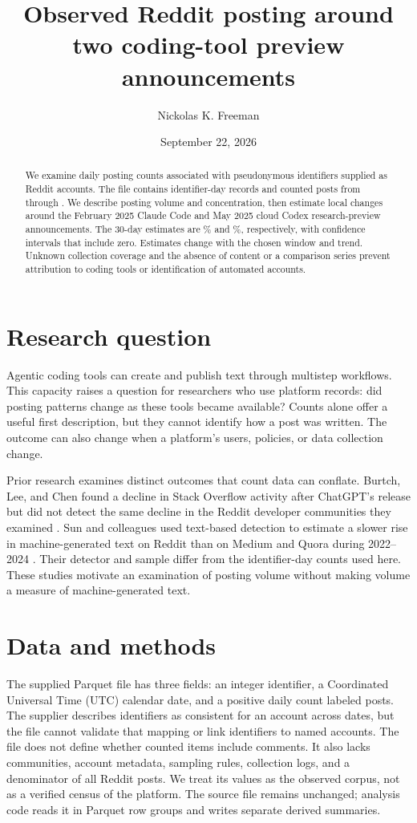 \documentclass[11pt]{article}
\title{Observed Reddit posting around two coding-tool preview announcements}
\author{Nickolas K. Freeman}
\date{September 22, 2026}
\begin{document}
\maketitle

\begin{abstract}
We examine daily posting counts associated with pseudonymous identifiers supplied as Reddit accounts. The file contains \dataUserDays{} identifier-day records and \dataPosts{} counted posts from \dataFirstDate{} through \dataLastRawDate{}. We describe posting volume and concentration, then estimate local changes around the February 2025 Claude Code and May 2025 cloud Codex research-preview announcements. The 30-day estimates are \claudeChange\% and \codexChange\%, respectively, with confidence intervals that include zero. Estimates change with the chosen window and trend. Unknown collection coverage and the absence of content or a comparison series prevent attribution to coding tools or identification of automated accounts.
\end{abstract}

\section{Research question}
Agentic coding tools can create and publish text through multistep workflows. This capacity raises a question for researchers who use platform records: did posting patterns change as these tools became available? Counts alone offer a useful first description, but they cannot identify how a post was written. The outcome can also change when a platform's users, policies, or data collection change.

Prior research examines distinct outcomes that count data can conflate. Burtch, Lee, and Chen found a decline in Stack Overflow activity after ChatGPT's release but did not detect the same decline in the Reddit developer communities they examined \cite{burtch2024}. Sun and colleagues used text-based detection to estimate a slower rise in machine-generated text on Reddit than on Medium and Quora during 2022--2024 \cite{sun2025}. Their detector and sample differ from the identifier-day counts used here. These studies motivate an examination of posting volume without making volume a measure of machine-generated text.

\section{Data and methods}
The supplied Parquet file has three fields: an integer identifier, a Coordinated Universal Time (UTC) calendar date, and a positive daily count labeled posts. The supplier describes identifiers as consistent for an account across dates, but the file cannot validate that mapping or link identifiers to named accounts. The file does not define whether counted items include comments. It also lacks communities, account metadata, sampling rules, collection logs, and a denominator of all Reddit posts. We treat its values as the observed corpus, not as a verified census of the platform. The source file remains unchanged; analysis code reads it in Parquet row groups and writes separate derived summaries.
\end{document}
